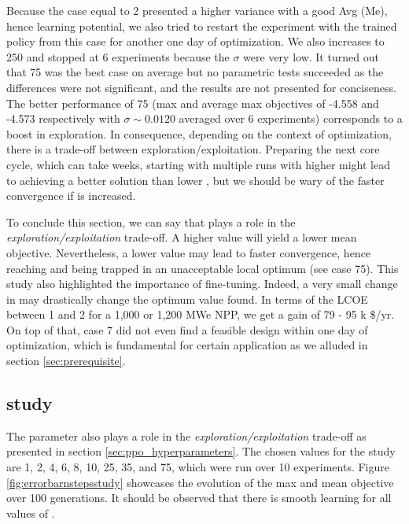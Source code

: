 Because the case  equal to 2 presented a higher variance with a good Avg (Me), hence learning potential, we also tried to restart the experiment with the trained policy from this case for another one day of optimization. We also increases  to 250 and stopped at 6 experiments because the $\sigma$ were very low. It turned out that 75 was the best case on average but no parametric tests succeeded as the differences were not significant, and the results are not presented for conciseness. The better performance of 75 (max and average max objectives of -4.558 and -4.573 respectively with $\sigma \sim 0.0120$ averaged over 6 experiments) corresponds to a boost in exploration. In consequence, depending on the context of optimization, there is a trade-off between exploration/exploitation. Preparing the next core cycle, which can take weeks, starting with multiple runs with higher  might lead to achieving a better solution than lower , but we should be wary of the faster convergence if  is increased.

To conclude this section, we can say that  plays a role in the \textit{exploration/exploitation} trade-off. A higher value will yield a lower mean objective. Nevertheless, a lower value may lead to faster convergence, hence reaching and being trapped in an unacceptable local optimum (see case 75). This study also highlighted the importance of fine-tuning. Indeed, a very small change in  may drastically change the optimum value found. In terms of the LCOE between 1 and 2 for a 1,000 or 1,200 MWe NPP, we get a gain of 79 - 95 k \$/yr.  On top of that, case 7 did not even find a feasible design within one day of optimization, which is fundamental for certain application as we alluded in section \ref{sec:prerequisite}.
\subsection{ study}
\label{sec:nsteps_study}
The parameter  also plays a role in the \textit{exploration/exploitation} trade-off as presented in section \ref{sec:ppo_hyperparameters}. The chosen values for the study are 1, 2, 4, 6, 8, 10, 25, 35, and 75, which were run over 10 experiments. Figure \ref{fig:errorbarnstepsstudy} showcases the evolution of the max and mean objective over 100 generations. It should be observed that there is 
 smooth learning for all values of . 

